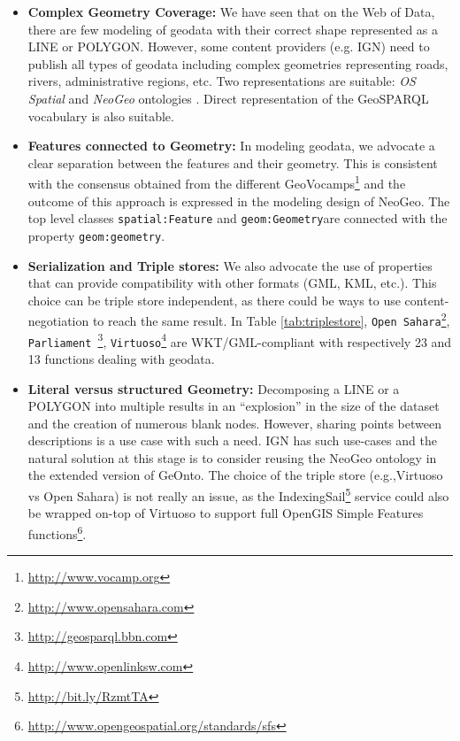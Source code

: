 \documentclass[a4paper,11pt]{report}
\begin{document}
\begin{itemize}
\item\textbf{Complex Geometry Coverage:} We have seen that on the Web of Data, there are few modeling of geodata with their correct shape represented as a LINE or POLYGON. However, some content providers (e.g. IGN) need to publish all types of geodata including complex geometries representing roads, rivers, administrative regions, etc. Two representations are suitable: \textit{OS Spatial} and \textit{NeoGeo} ontologies . Direct representation of the GeoSPARQL vocabulary is also suitable.
\item \textbf{Features connected to Geometry:} In modeling geodata, we advocate a clear separation between the features and their geometry. This is consistent with the consensus obtained from the different GeoVocamps\footnote{\url{http://www.vocamp.org}} and the outcome of this approach is expressed in the modeling design of NeoGeo. The top level classes \texttt{spatial:Feature} and \texttt{geom:Geometry}are connected with the property \texttt{geom:geometry}.
\item \textbf{Serialization and Triple stores:} We also advocate the use of properties that can provide compatibility with other formats (GML, KML, etc.). This choice can be triple store independent, as there could be ways to use content-negotiation to reach the same result. In Table \ref{tab:triplestore}, \texttt{Open Sahara}\footnote{\url{http://www.opensahara.com}}, \texttt{Parliament }\footnote{\url{http://geosparql.bbn.com}},  \texttt{Virtuoso}\footnote{\url{http://www.openlinksw.com}} are WKT/GML-compliant with respectively 23 and 13 functions dealing with geodata.
\item \textbf{Literal versus structured Geometry:} Decomposing a LINE or a POLYGON into multiple results in an ``explosion'' in the size of the dataset and the creation of numerous blank nodes. However, sharing points between descriptions is a use case with such a need. IGN has such use-cases and the natural solution at this stage is to consider reusing the NeoGeo ontology in the extended version of GeOnto. The choice of the triple store (e.g.,Virtuoso vs Open Sahara) is not really an issue, as the IndexingSail\footnote{\url{http://bit.ly/RzmtTA}} service could also be wrapped on-top of Virtuoso to support full OpenGIS Simple Features functions\footnote{\url{http://www.opengeospatial.org/standards/sfs}}.
\end{itemize}
\end{document}
